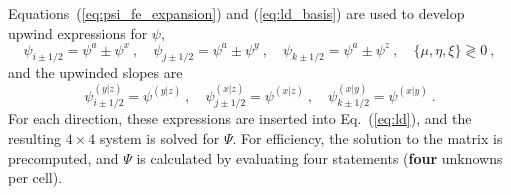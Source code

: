\documentclass[12pt]{article}
\begin{document}
Equations~(\ref{eq:psi_fe_expansion}) and (\ref{eq:ld_basis}) are used to
develop upwind expressions for $\psi$,
\begin{equation}
  \psi_{i\pm1/2}=\psi^a\pm\psi^x\:,\quad
  \psi_{j\pm1/2}=\psi^a\pm\psi^y\:,\quad \psi_{k\pm1/2}=\psi^a\pm\psi^z\:,\quad
  \{\mu,\eta,\xi\}\gtrless 0\:,
\end{equation}
and the upwinded slopes are
\begin{equation}
  \psi_{i\pm1/2}^{(y|z)}=\psi^{(y|z)}\:,\quad
  \psi_{j\pm1/2}^{(x|z)}=\psi^{(x|z)}\:,\quad
  \psi_{k\pm1/2}^{(x|y)}=\psi^{(x|y)}\:.
\end{equation}
For each direction, these expressions are inserted into Eq.~(\ref{eq:ld}), and
the resulting $4\times4$ system is solved for $\Psi$.  For efficiency, the
solution to the matrix is precomputed, and $\Psi$ is calculated by evaluating
four statements (\textbf{four} unknowns per cell).
 
\end{document}
